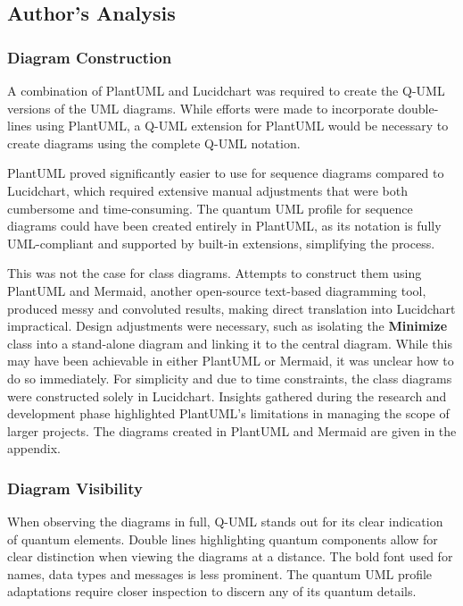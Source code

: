 \documentclass{article}
\begin{document}
\subsection{Author's Analysis}

\subsubsection{Diagram Construction}

A combination of PlantUML and Lucidchart was required to create the Q-UML versions of the UML diagrams. While efforts were made to incorporate double-lines using PlantUML, a Q-UML extension for PlantUML would be necessary to create diagrams using the complete Q-UML notation.

PlantUML proved significantly easier to use for sequence diagrams compared to Lucidchart, which required extensive manual adjustments that were both cumbersome and time-consuming. The quantum UML profile for sequence diagrams could have been created entirely in PlantUML, as its notation is fully UML-compliant and supported by built-in extensions, simplifying the process.

This was not the case for class diagrams. Attempts to construct them using PlantUML and Mermaid, another open-source text-based diagramming tool, produced messy and convoluted results, making direct translation into Lucidchart impractical. Design adjustments were necessary, such as isolating the \textbf{Minimize} class into a stand-alone diagram and linking it to the central diagram. While this may have been achievable in either PlantUML or Mermaid, it was unclear how to do so immediately. For simplicity and due to time constraints, the class diagrams were constructed solely in Lucidchart. Insights gathered during the research and development phase highlighted PlantUML's limitations in managing the scope of larger projects\cite{plantreddit}. The diagrams created in PlantUML and Mermaid are given in the appendix. 

\subsubsection{Diagram Visibility}

When observing the diagrams in full, Q-UML stands out for its clear indication of quantum elements. Double lines highlighting quantum components allow for clear distinction when viewing the diagrams at a distance. The bold font used for names, data types and messages is less prominent. The quantum UML profile adaptations require closer inspection to discern any of its quantum details.
\end{document}
